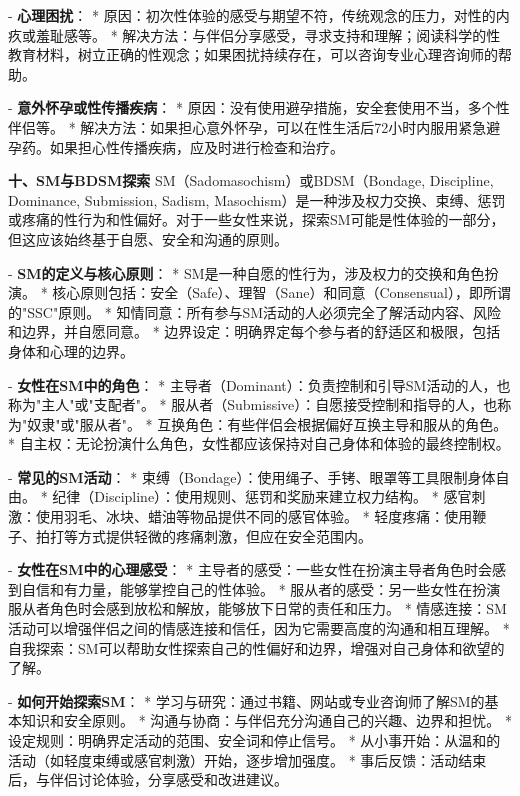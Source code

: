 \begin{enumerate}
  - \textbf{心理困扰}：
    * 原因：初次性体验的感受与期望不符，传统观念的压力，对性的内疚或羞耻感等。
    * 解决方法：与伴侣分享感受，寻求支持和理解；阅读科学的性教育材料，树立正确的性观念；如果困扰持续存在，可以咨询专业心理咨询师的帮助。

  - \textbf{意外怀孕或性传播疾病}：
    * 原因：没有使用避孕措施，安全套使用不当，多个性伴侣等。
    * 解决方法：如果担心意外怀孕，可以在性生活后72小时内服用紧急避孕药。如果担心性传播疾病，应及时进行检查和治疗。

  \textbf{十、SM与BDSM探索}
  SM（Sadomasochism）或BDSM（Bondage, Discipline, Dominance, Submission, Sadism, Masochism）是一种涉及权力交换、束缚、惩罚或疼痛的性行为和性偏好。对于一些女性来说，探索SM可能是性体验的一部分，但这应该始终基于自愿、安全和沟通的原则。

  - \textbf{SM的定义与核心原则}：
    * SM是一种自愿的性行为，涉及权力的交换和角色扮演。
    * 核心原则包括：安全（Safe）、理智（Sane）和同意（Consensual），即所谓的"SSC"原则。
    * 知情同意：所有参与SM活动的人必须完全了解活动内容、风险和边界，并自愿同意。
    * 边界设定：明确界定每个参与者的舒适区和极限，包括身体和心理的边界。

  - \textbf{女性在SM中的角色}：
    * 主导者（Dominant）：负责控制和引导SM活动的人，也称为"主人"或"支配者"。
    * 服从者（Submissive）：自愿接受控制和指导的人，也称为"奴隶"或"服从者"。
    * 互换角色：有些伴侣会根据偏好互换主导和服从的角色。
    * 自主权：无论扮演什么角色，女性都应该保持对自己身体和体验的最终控制权。

  - \textbf{常见的SM活动}：
    * 束缚（Bondage）：使用绳子、手铐、眼罩等工具限制身体自由。
    * 纪律（Discipline）：使用规则、惩罚和奖励来建立权力结构。
    * 感官刺激：使用羽毛、冰块、蜡油等物品提供不同的感官体验。
    * 轻度疼痛：使用鞭子、拍打等方式提供轻微的疼痛刺激，但应在安全范围内。

  - \textbf{女性在SM中的心理感受}：
    * 主导者的感受：一些女性在扮演主导者角色时会感到自信和有力量，能够掌控自己的性体验。
    * 服从者的感受：另一些女性在扮演服从者角色时会感到放松和解放，能够放下日常的责任和压力。
    * 情感连接：SM活动可以增强伴侣之间的情感连接和信任，因为它需要高度的沟通和相互理解。
    * 自我探索：SM可以帮助女性探索自己的性偏好和边界，增强对自己身体和欲望的了解。

  - \textbf{如何开始探索SM}：
    * 学习与研究：通过书籍、网站或专业咨询师了解SM的基本知识和安全原则。
    * 沟通与协商：与伴侣充分沟通自己的兴趣、边界和担忧。
    * 设定规则：明确界定活动的范围、安全词和停止信号。
    * 从小事开始：从温和的活动（如轻度束缚或感官刺激）开始，逐步增加强度。
    * 事后反馈：活动结束后，与伴侣讨论体验，分享感受和改进建议。


\end{enumerate}
